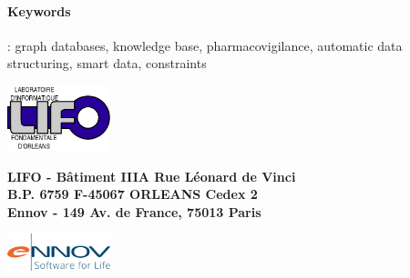 {\begin{sffamily}
{\begin{minipage}{\textwidth}
\paragraph{Keywords} : graph databases, knowledge base, pharmacovigilance, automatic data structuring, smart data, constraints
\end{minipage}
}

\vspace{0.8cm}

\begin{minipage}{3cm}
\includegraphics[width=3cm]{logos/logoLIFO.png} 
\end{minipage}
\hfill
\begin{minipage}{9cm}
\centering
\textbf{LIFO - Bâtiment IIIA Rue Léonard de Vinci \\B.P. 6759 F-45067 ORLEANS Cedex 2}\\
\textbf{Ennov - 149 Av. de France, 75013 Paris}
\end{minipage}
\hfill
\begin{minipage}{3cm}
\includegraphics[width=3cm]{logos/logoEnnov.png}
\end{minipage}

\end{sffamily}
}
